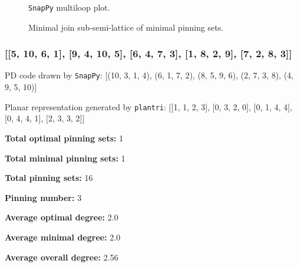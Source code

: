 \documentclass{article}%
\begin{document}
\begin{multicols}{2}
\begin{figure}[H]
\centering

\caption{\texttt{SnapPy} multiloop plot.}
\label{fig:tex/img/[[5, 10, 6, 1], [9, 4, 10, 5], [6, 2, 7, 1], [3, 8, 4, 9], [2, 8, 3, 7]].svg}
\end{figure}
\columnbreak

\begin{figure}[H]
\centering
\scalebox{0.8}{}
\caption{Minimal join sub-semi-lattice of minimal pinning sets.}
\label{fig:tex/img/[[5, 10, 6, 1], [9, 4, 10, 5], [6, 2, 7, 1], [3, 8, 4, 9], [2, 8, 3, 7]].pgf}
\end{figure}
\end{multicols}

\newpage

\subsubsection{[[5, 10, 6, 1], [9, 4, 10, 5], [6, 4, 7, 3], [1, 8, 2, 9], [7, 2, 8, 3]]}

{\small\noindent PD code drawn by \texttt{SnapPy}: [(10, 3, 1, 4), (6, 1, 7, 2), (8, 5, 9, 6), (2, 7, 3, 8), (4, 9, 5, 10)]}

{\small\noindent Planar representation generated by \texttt{plantri}: [[1, 1, 2, 3], [0, 3, 2, 0], [0, 1, 4, 4], [0, 4, 4, 1], [2, 3, 3, 2]]}

\begin{multicols}{2}
{\normalsize \noindent\textbf{Total optimal pinning sets:} 1

\noindent\textbf{Total minimal pinning sets:} 1

\noindent\textbf{Total pinning sets:} 16

\noindent\textbf{Pinning number:} 3

}
\columnbreak

{\normalsize \noindent\textbf{Average optimal degree:} 2.0

\noindent\textbf{Average minimal degree:} 2.0

\noindent\textbf{Average overall degree:} 2.56

}
\end{multicols}
\end{document}
